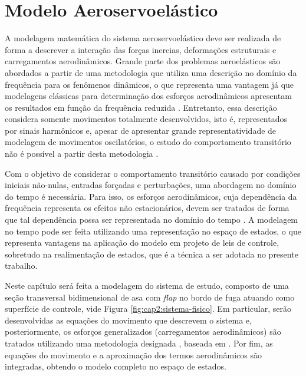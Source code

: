 \chapter{Modelo Aeroservoelástico}\label{cap:modelo}
A modelagem matemática do sistema aeroservoelástico deve ser realizada de forma a descrever a interação das forças inercias, deformações estruturais e carregamentos aerodinâmicos. Grande parte dos problemas aeroelásticos são abordados a partir de uma metodologia que utiliza uma descrição no domínio da frequência para os fenômenos dinâmicos, o que representa uma vantagem já que modelagens clássicas para determinação dos esforços aerodinâmicos apresentam os resultados em função da frequência reduzida \cite{book:Wright-Cooper}. Entretanto, essa descrição considera somente movimentos totalmente desenvolvidos, isto é, representados por sinais harmônicos e, apesar de apresentar grande representatividade de modelagem de movimentos oscilatórios, o estudo do comportamento transitório não é possível a partir desta metodologia \cite{book:Fung}.

Com o objetivo de considerar o comportamento transitório causado por condições iniciais não-nulas, entradas forçadas e perturbações, uma abordagem no domínio do tempo é necessária. Para isso, os esforços aerodinâmicos, cuja dependência da frequência representa os efeitos não estacionários, devem ser tratados de forma que tal dependência possa ser representada no domínio do tempo \cite{book:Wright-Cooper}. A modelagem no tempo pode ser feita utilizando uma representação no espaço de estados, o que representa vantagens na aplicação do modelo em projeto de leis de controle, sobretudo na realimentação de estados, que é a técnica a ser adotada no presente trabalho.

Neste capítulo será feita a modelagem do sistema de estudo, composto de uma seção transversal bidimensional de asa com \textit{flap} no bordo de fuga atuando como superfície de controle, vide Figura \ref{fig:cap2:sistema-fisico}. Em particular, serão desenvolvidas as equações do movimento que descrevem o sistema e, posteriormente, os esforços generalizados (carregamentos aerodinâmicos) são tratados utilizando uma metodologia designada , baseada em \textcite{art:RogerRFA1977}. Por fim, as equações do movimento e a aproximação dos termos aerodinâmicos são integradas, obtendo o modelo completo no espaço de estados.

